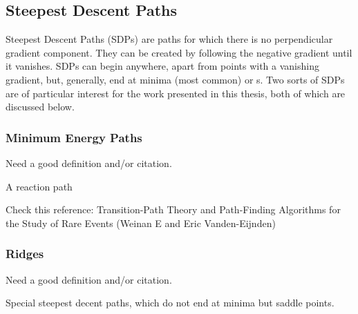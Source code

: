\subsection{Steepest Descent Paths}
\label{sec:sdps}

Steepest Descent Paths (SDPs) are paths for which there is no perpendicular gradient component.
They can be created by following the negative gradient until it vanishes.
SDPs can begin anywhere, apart from points with a vanishing gradient, but, generally, end at minima (most common) or \sap{}s.
Two sorts of SDPs are of particular interest for the work presented in this thesis, both of which are discussed below.

\subsubsection{Minimum Energy Paths}
\label{sec:meps}

\bit
\item Need a good definition and/or citation.
\item A reaction path
\eit

Check this reference:
Transition-Path Theory and Path-Finding Algorithms for the Study of Rare Events
(Weinan E and Eric Vanden-Eijnden)


\placeholder

\subsubsection{Ridges}
\label{sec:ridges}

\bit
\item Need a good definition and/or citation.
\item Special steepest decent paths, which do not end at minima but saddle points.
\eit

\placeholder


